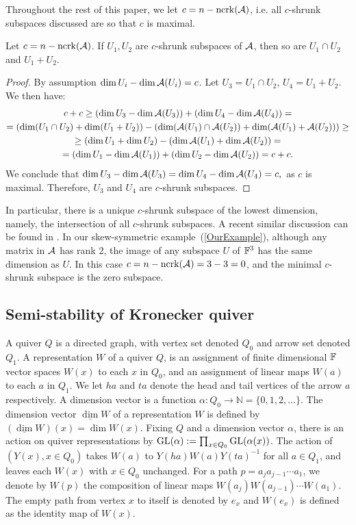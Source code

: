 Throughout the rest of this paper, we let $c=n-\operatorname{ncrk}(\mathcal{A})$, i.e. all $c$-shrunk subspaces discussed are so that $c$ is maximal. 

\begin{lemma}\label{combinecshrunk}  Let $c=n-\operatorname{ncrk}(\mathcal{A})$. If $U_1,U_2$ are $c$-shrunk subspaces of $\mathcal{A}$, then so are $U_1\cap U_2$ and $U_1+U_2$.
\end{lemma}
\begin{proof} By assumption $\dim U_i-\dim \mathcal{A}(U_i)=c$. Let $U_3=U_1\cap U_2$, $U_4=U_1+U_2$. We then have:
\begin{multline*}
c+c\geq ( \dim U_3-\dim \mathcal{A}(U_3))+(\dim U_4-\dim \mathcal{A}(U_4))=\\ = ( \dim(U_1\cap U_2)+\dim(U_1+U_2)) -(\dim(\mathcal{A}(U_1)\cap \mathcal{A}(U_2))+\dim(\mathcal{A}(U_1)+\mathcal{A}(U_2)))\geq\\ \geq
(\dim U_1+\dim U_2)-(\dim \mathcal{A}(U_1)+\dim \mathcal{A}(U_2))=\\=(\dim U_1-\dim \mathcal{A}(U_1))+(\dim U_2-\dim \mathcal{A}(U_2))=c+c.
\end{multline*}
We conclude that  $\dim U_3-\dim \mathcal{A}(U_3)=\dim U_4-\dim \mathcal{A}(U_4)=c,$ as $c$ is maximal.
Therefore, $U_3$ and $U_4$ are $c$-shrunk subspaces.
\end{proof}

In particular, there is a unique $c$-shrunk subspace of the lowest dimension, namely, the intersection of all $c$-shrunk subspaces. A recent similar discussion can be found in \cite{IMQ21}. In our skew-symmetric example~(\ref{OurExample}), although any matrix in $\mathcal{A}$ has rank $2$, the image of any subspace $U$ of ${\mathbb F}^3$ has the same dimension as $U$. In this case $c=n-\operatorname{ncrk}(\mathcal{A})=3-3=0$, and the minimal $c$-shrunk subspace is the zero subspace.


\subsection{Semi-stability of Kronecker quiver}
A quiver $Q$ is a directed graph, with vertex set denoted $Q_0$ and arrow set denoted $Q_1$. A representation $W$ of a quiver $Q$, is an assignment of finite dimensional ${\mathbb F}$ vector spaces $W(x)$ to each $x$ in $Q_0$, and an assignment of linear maps $W(a)$ to each $a$ in $Q_1$. We let $ha$ and $ta$ denote the head and tail vertices of the arrow $a$ respectively. A dimension vector is a function $\alpha:Q_0\to {\mathbb N}=\{0,1,2,\dots\}$.
The dimension vector $\underline{\dim} W$
of a representation $W$ is defined by $(\underline{\dim} W)(x)=\dim W(x)$.
Fixing $Q$ and a dimension vector $\alpha$, there is an action on quiver representations by $\operatorname{GL}(\alpha):=\prod_{x\in Q_0} \operatorname{GL}(\alpha(x))$. The action of $(Y(x),x\in Q_0)$ takes $W(a)$ to $Y(ha)W(a)Y(ta)^{-1}$ for all $a\in Q_1$, and leaves each $W(x)$ with $x\in Q_0$ unchanged. For a path $p=a_ja_{j-1}\cdots a_1$, we denote by $W(p)$ the composition of linear maps $W(a_j)W(a_{j-1})\cdots W(a_1)$. The empty path from vertex $x$ to itself is denoted by $e_x$ and $W(e_x)$ is defined as the identity map of $W(x)$.

